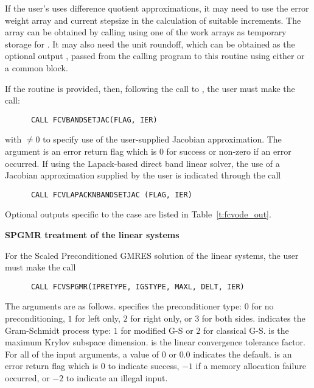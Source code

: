 \begin{Steps}
  If the user's  uses difference quotient approximations, it
  may need to use the error weight array  and current stepsize 
  in the calculation of suitable increments.  The array  can be
  obtained by calling  using one of the work arrays as
  temporary storage for .  It may also need the unit roundoff,
  which can be obtained as the optional output , passed from
  the calling program to this routine using either  or a common block.

  If the  routine is provided, then, following the call to ,
  the user must make the call:
\begin{verbatim}
      CALL FCVBANDSETJAC(FLAG, IER)
\end{verbatim}
  with  $\neq 0$ to specify use of the user-supplied Jacobian approximation.
  The argument  is an error return flag which is $0$ 
  for success or non-zero if an error occurred.
  If using the Lapack-based direct band linear solver, the use of a
  Jacobian approximation supplied by the user is indicated through the call
\begin{verbatim}
      CALL FCVLAPACKNBANDSETJAC (FLAG, IER)
\end{verbatim}

  Optional outputs specific to the {\band} case are listed in Table~\ref{t:fcvode_out}.

  
  {\s}{\p} {\bf SPGMR treatment of the linear systems}
  
  For the Scaled Preconditioned GMRES solution of the linear systems,
  the user must make the call
\begin{verbatim}
      CALL FCVSPGMR(IPRETYPE, IGSTYPE, MAXL, DELT, IER)
\end{verbatim}
  The arguments are as follows.
   specifies the preconditioner type: 
  $0$ for no preconditioning, $1$ for left only, $2$ for right only, or $3$ for
  both sides.  indicates the Gram-Schmidt process type: 
  $1$ for modified G-S or $2$ for classical G-S.
   is the maximum Krylov subspace dimension.
   is the linear convergence tolerance factor.
  For all of the input arguments, a value of $0$ or $0.0$ indicates the default.
   is an error return flag which is $0$ to indicate success, $-1$
  if a memory allocation failure occurred, or $-2$ to indicate an illegal input.
  

\end{Steps}
